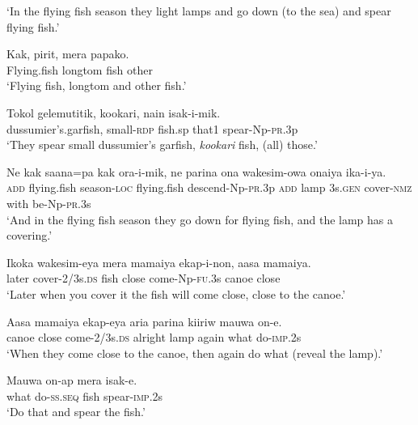 \glt ‘In the flying fish season they light lamps and go down (to the sea) and spear flying fish.’ \\
\z


\ea
\gll  Kak,  pirit,  mera  papako. \\
Flying.fish  longtom  fish  other \\
\glt ‘Flying fish, longtom and other fish.’ \\
\z


\ea
\gll  Tokol  gelemutitik,  kookari,  nain  isak-i-mik. \\
dussumier’s.garfish,  small-\textsc{rdp}  fish.sp  that1  spear-Np-\textsc{pr}.3p \\
\glt ‘They spear small dussumier’s garfish, \textit{kookari} fish, (all) those.’ \\
\z


\ea
\gll  Ne  kak  saana=pa  kak  ora-i-mik,  ne                      parina  ona  wakesim-owa  onaiya  ika-i-ya. \\
\textsc{add}  flying.fish  season-\textsc{loc}  flying.fish  descend-Np-\textsc{pr}.3p  \textsc{add}  lamp  3s.\textsc{gen}  cover-\textsc{nmz}  with  be-Np-\textsc{pr}.3s \\


\glt ‘And in the flying fish season they go down for flying fish, and the lamp has a covering.’ \\
\z


\ea
\gll  Ikoka  wakesim-eya  mera  mamaiya  ekap-i-non,  aasa  mamaiya. \\
later  cover-2/3s.\textsc{ds}  fish  close  come-Np-\textsc{fu}.3s      canoe  close \\


\glt ‘Later when you cover it the fish will come close, close to the canoe.’ \\
\z


\ea
\gll  Aasa  mamaiya  ekap-eya  aria  parina  kiiriw    mauwa  on-e. \\
canoe  close  come-2/3s.\textsc{ds}  alright  lamp  again       what  do-\textsc{imp}.2s \\


\glt ‘When they come close to the canoe, then again do what (reveal the lamp).’ \\
\z


\ea
\gll  Mauwa  on-ap  mera  isak-e. \\
what  do-\textsc{ss.seq}  fish  spear-\textsc{imp}.2s \\
\glt ‘Do that and spear the fish.’ \\
\z


